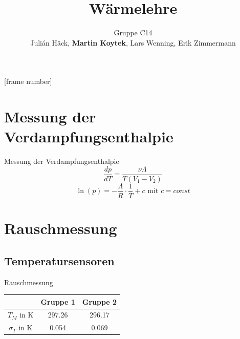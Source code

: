 \documentclass[11pt]{beamer}
\author{Gruppe C14 \\ Julián Häck,\textbf{ Martin Koytek}, Lars Wenning, Erik Zimmermann}
\title{Wärmelehre}
\begin{document}
[frame number]
\begin{frame}
\titlepage
\end{frame}

\section{Messung der Verdampfungsenthalpie}
\begin{frame}{Messung der Verdampfungsenthalpie}
\begin{equation*}
\frac{dp}{dT}=\frac{\nu \Lambda}{T(V_1-V_2)}
\end{equation*}
\begin{equation*}
\ln(p)=-\frac{\Lambda}{R}\cdot \frac{1}{T}+c \text{ mit } c=const
\end{equation*}
\end{frame}

\section{Rauschmessung}
\subsection{Temperatursensoren}
\begin{frame}{Rauschmessung}
\begin{figure}[H]
\end{figure}
\begin{table}[H]\centering
\begin{tabular}{c|c|c}
 & Gruppe 1 & Gruppe 2 \\ 
\hline 
$T_M$ in K & 297.26 & 296.17 \\ 
$\sigma_T$ in K & 0.054 & 0.069 \\  
\end{tabular} 
\end{table}
\end{frame}
\end{document}
